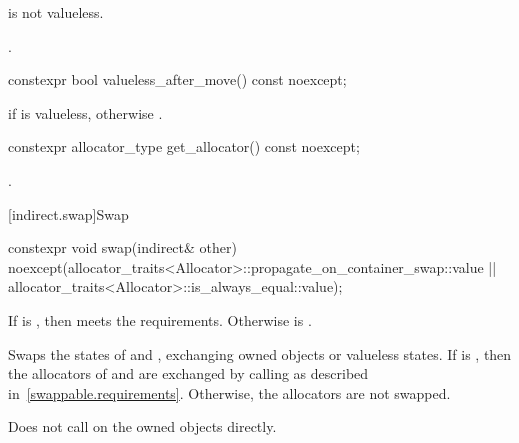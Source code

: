 \begin{itemdescr}
\pnum
\expects
{} is not valueless.

\pnum
\returns
{}.
\end{itemdescr}

%
\begin{itemdecl}
constexpr bool valueless_after_move() const noexcept;
\end{itemdecl}

\begin{itemdescr}
\pnum
\returns
{} if  is valueless, otherwise .
\end{itemdescr}

%
\begin{itemdecl}
constexpr allocator_type get_allocator() const noexcept;
\end{itemdecl}

\begin{itemdescr}
\pnum
\returns
{}.
\end{itemdescr}

[indirect.swap]{Swap}

%
\begin{itemdecl}
constexpr void swap(indirect& other)
  noexcept(allocator_traits<Allocator>::propagate_on_container_swap::value ||
           allocator_traits<Allocator>::is_always_equal::value);
\end{itemdecl}

\begin{itemdescr}
\pnum
\expects
If
is , then
 meets the  requirements.
Otherwise  is .

\pnum
\effects
Swaps the states of  and ,
exchanging owned objects or valueless states.
If 
is ,
then the allocators of  and 
are exchanged by calling  as described in~\ref{swappable.requirements}.
Otherwise,
the allocators are not swapped.
\begin{note}
Does not call  on the owned objects directly.
\end{note}
\end{itemdescr}

